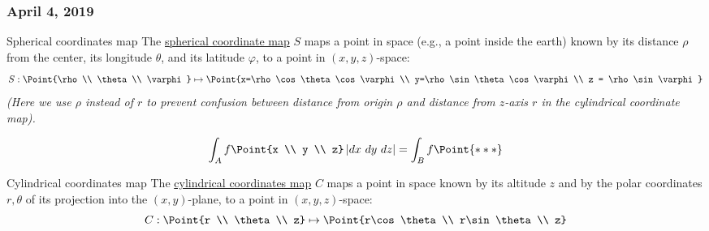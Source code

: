 \subsubsection*{April 4, 2019}
\begin{proposition}
\end{proposition}

\begin{defn}{Spherical coordinates map}
	The \ul{spherical coordinate map} $S$ maps a point in space (e.g., a point inside the earth) known by its distance $\rho$ from the center, its longitude $\theta$, and its latitude $\varphi$, to a point in $(x,y,z)$-space:
	\begin{equation}
		S : \Point{\rho \\ \theta \\ \varphi} \mapsto \Point{x=\rho\cos\theta\cos\varphi \\ y=\rho\sin\theta\cos\varphi \\ z = \rho\sin\varphi}
	\end{equation}
	\emph{(Here we use $\rho$ instead of $r$ to prevent confusion between distance from origin $\rho$ and distance from $z$-axis $r$ in the cylindrical coordinate map). }
\end{defn}

\begin{proposition}
	\begin{equation}
		\int_A f\Point{x \\ y \\ z} \left|dx\ dy\ dz\right| = \int_B f\Point{***}
	\end{equation}
\end{proposition}

\begin{defn}{Cylindrical coordinates map}
	The \ul{cylindrical coordinates map} $C$ maps a point in space known by its altitude $z$ and by the polar coordinates $r, \theta$ of its projection into the $(x,y)$-plane, to a point in $(x,y,z)$-space: 
	\begin{equation}
		C : \Point{r \\ \theta \\ z} \mapsto \Point{r\cos\theta \\ r\sin\theta \\ z}
	\end{equation}
\end{defn}